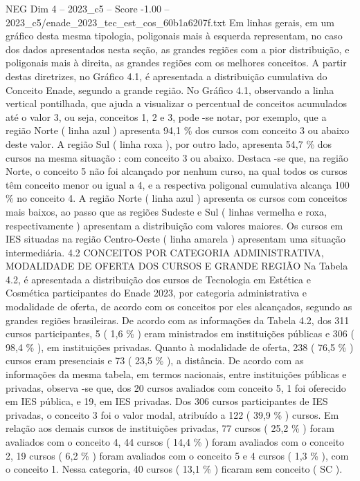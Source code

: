 \begin{textsample}{NEG Dim 4 – 2023\_c5 – Score -1.00 – 2023\_c5/enade\_2023\_tec\_est\_cos\_60b1a6207f.txt}
Em linhas gerais, em um gráfico desta mesma tipologia, poligonais mais à esquerda representam, no caso dos dados apresentados nesta seção, as grandes regiões com a pior distribuição, e poligonais mais à direita, as grandes regiões com os melhores conceitos.
A partir destas diretrizes, no Gráfico 4.1, é apresentada a distribuição cumulativa do Conceito Enade, segundo a grande região.
No Gráfico 4.1, observando a linha vertical pontilhada, que ajuda a visualizar o percentual de conceitos acumulados até o valor 3, ou seja, conceitos 1, 2 e 3, pode -se notar, por exemplo, que a região Norte ( linha azul ) apresenta 94,1 \% dos cursos com conceito 3 ou abaixo deste valor.
A região Sul ( linha roxa ), por outro lado, apresenta 54,7 \% dos cursos na mesma situação : com conceito 3 ou abaixo.
Destaca -se que, na região Norte, o conceito 5 não foi alcançado por nenhum curso, na qual todos os cursos têm conceito menor ou igual a 4, e a respectiva poligonal cumulativa alcança 100 \% no conceito 4.
A região Norte ( linha azul ) apresenta os cursos com conceitos mais baixos, ao passo que as regiões Sudeste e Sul ( linhas vermelha e roxa, respectivamente ) apresentam a distribuição com valores maiores.
Os cursos em IES situadas na região Centro-Oeste ( linha amarela ) apresentam uma situação intermediária. 4.2 CONCEITOS POR CATEGORIA ADMINISTRATIVA, MODALIDADE DE OFERTA DOS CURSOS E GRANDE REGIÃO Na Tabela 4.2, é apresentada a distribuição dos cursos de Tecnologia em Estética e Cosmética participantes do Enade 2023, por categoria administrativa e modalidade de oferta, de acordo com os conceitos por eles alcançados, segundo as grandes regiões brasileiras.
De acordo com as informações da Tabela 4.2, dos 311 cursos participantes, 5 ( 1,6 \% ) eram ministrados em instituições públicas e 306 ( 98,4 \% ), em instituições privadas.
Quanto à modalidade de oferta, 238 ( 76,5 \% ) cursos eram presenciais e 73 ( 23,5 \% ), a distância.
De acordo com as informações da mesma tabela, em termos nacionais, entre instituições públicas e privadas, observa -se que, dos 20 cursos avaliados com conceito 5, 1 foi oferecido em IES pública, e 19, em IES privadas.
Dos 306 cursos participantes de IES privadas, o conceito 3 foi o valor modal, atribuído a 122 ( 39,9 \% ) cursos.
Em relação aos demais cursos de instituições privadas, 77 cursos ( 25,2 \% ) foram avaliados com o conceito 4, 44 cursos ( 14,4 \% ) foram avaliados com o conceito 2, 19 cursos ( 6,2 \% ) foram avaliados com o conceito 5 e 4 cursos ( 1,3 \% ), com o conceito 1.
Nessa categoria, 40 cursos ( 13,1 \% ) ficaram sem conceito ( SC ).

\end{textsample}
